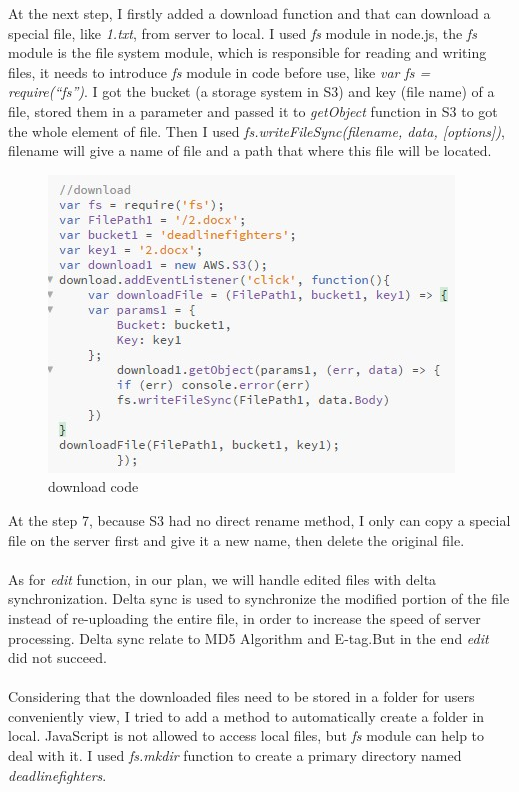 \documentclass[a4paper]{article}
\begin{document}
{At the next step, I firstly added a download function and that can download a special file, like \emph{1.txt}, from server to local. I used \emph{fs} module in node.js, the \emph{fs} module is the file system module, which is responsible for reading and writing files, it needs to introduce \emph{fs} module in code before use, like \emph{var fs = require(“fs”)}. I got the bucket (a storage system in S3) and key (file name) of a file, stored them in a parameter and passed it to \emph{getObject} function in S3 to got the whole element of file. Then I used \emph{fs.writeFileSync(filename, data, [options])}, filename will give a name of file and a path that where this file will be located. 

\begin{figure}[h!]
\centering
\includegraphics[scale=1.3]{code1}
\caption{download code}
\label{fig:code1}
\end{figure}

At the step 7, because S3 had no direct rename method, I only can copy a special file on the server first and give it a new name, then delete the original file.\\\\

As for \emph{edit} function, in our plan, we will handle edited files with delta synchronization. Delta sync is used to synchronize the modified portion of the file instead of re-uploading the entire file, in order to increase the speed of server processing. Delta sync relate to MD5 Algorithm and E-tag.But in the end \emph{edit} did not succeed.\\\\

Considering that the downloaded files need to be stored in a folder for users conveniently view, I tried to add a method to automatically create a folder in local. JavaScript is not allowed to access local files, but \emph{fs} module can help to deal with it. I used \emph{fs.mkdir} function to create a primary directory named \emph{deadlinefighters}.\\\\


}
\end{document}

